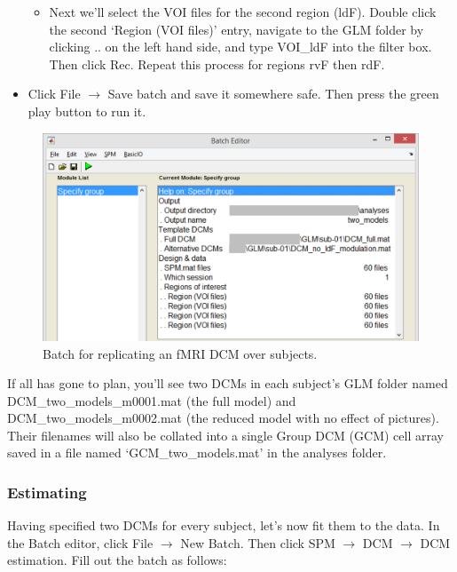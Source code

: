 \documentclass{article}
\begin{document}
\begin{itemize}
\begin{itemize}
\item Next we'll select the VOI files for the second region (ldF). Double click the second `Region (VOI files)' entry, navigate to the GLM folder by clicking .. on the left hand side, and type VOI\_ldF into the filter box. Then click Rec. Repeat this process for regions rvF then rdF.

\end{itemize}
\item Click File $\rightarrow$ Save batch and save it somewhere safe. Then press the green play button to run it.
\end{itemize}

\begin{figure}[ht]
\begin{center}
\includegraphics[width=\textwidth]{"Fig_batch_specify_group"}
\caption{Batch for replicating an fMRI DCM over subjects. \label{Fig_batch_specify_group}}
\end{center}
\end{figure}

If all has gone to plan, you'll see two DCMs in each subject's GLM folder named \\ DCM\_two\_models\_m0001.mat (the full model) and DCM\_two\_models\_m0002.mat (the reduced model with no effect of pictures). Their filenames will also be collated into a single Group DCM (GCM) cell array saved in a file named `GCM\_two\_models.mat' in the analyses folder.

\subsubsection{Estimating} \label{GUI_estimation}

Having specified two DCMs for every subject, let's now fit them to the data. In the Batch editor, click File $\rightarrow$ New Batch. Then click SPM $\rightarrow$ DCM $\rightarrow$ DCM estimation. Fill out the batch as follows:
\end{document}
